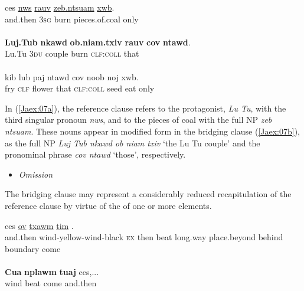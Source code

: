 \documentclass[output=paper]{LSP/langsci}
\begin{document}
\begin{exe}
\ex \label{Jaex:07ac}
\begin{xlist}
\ex \label{Jaex:07a}
\gll ces  \underline{nws} \underline{rauv} \underline{zeb.ntsuam} \underline{xwb}.\\
and.then 3\textsc{sg} burn pieces.of.coal only\\
\glt {}\\
\ex \label{Jaex:07b}
\gll \textbf{Luj.Tub} \textbf{nkawd} \textbf{ob.niam.txiv} \textbf{rauv} \textbf{cov}  \textbf{ntawd}.\\
Lu.Tu 3\textsc{du} couple burn \textsc{clf:coll} that\\
\glt {}\\
\ex \label{Jaex:07c}
\gll kib lub paj ntawd cov noob noj xwb.\\     	      
     fry \textsc{clf} flower that  \textsc{clf:coll} seed eat only\\
\glt {} \citep[][3]{johnson92}
\end{xlist}
\end{exe}

\noindent
In (\ref{Jaex:07a}), the reference clause refers to the protagonist, \textit{Lu Tu}, with the third singular pronoun \textit{nws}, and to the pieces of coal with the full NP \textit{zeb ntsuam}. These nouns appear in modified form in the bridging clause (\ref{Jaex:07b}), as the full NP \textit{Luj Tub nkawd ob niam txiv } `the Lu Tu couple' and the pronominal phrase \textit{cov ntawd } `those', respectively. 

%
\begin{itemize}
\item \textit{Omission}
\end{itemize}

The bridging clause may represent a considerably reduced recapitulation of the reference clause by virtue of the  of one or more elements.

%
\begin{exe}
\ex \label{Jaex:08ab}
\begin{xlist}
\ex \label{Jaex:08a}
\gll ces  \underline{} \underline{ov} \underline{txawm} \underline{} \underline{} \underline{tim} \underline{} \underline{} \underline{}.\\
and.then wind-yellow-wind-black \textsc{ex} then beat long.way place.beyond behind boundary come \\
\glt {}\\
\ex \label{Jaex:08b}
\gll \textbf{Cua}  \textbf{nplawm}  \textbf{tuaj} ces,...\\     	      
     wind  beat   come  and.then\\
\glt {} \citep[][4]{johnson92}
\end{xlist}
\end{exe}
\end{document}
